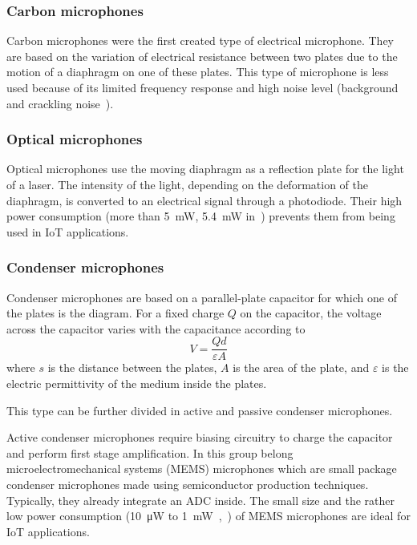 \documentclass{EPL-master-thesis-covers-EN}
\begin{document}
\subsubsection*{Carbon microphones}

Carbon microphones were the first created type of electrical microphone. They are based on the variation of electrical resistance between two plates due to the motion of a diaphragm on one of these plates. This type of microphone is less used because of its limited frequency response and high noise level (background and crackling noise~\cite{background.noise}).

\subsubsection*{Optical microphones}

Optical microphones use the moving diaphragm as a reflection plate for the light of a laser. The intensity of the light, depending on the deformation of the diaphragm, is converted to an electrical signal through a photodiode. Their high power consumption (more than \SI{5}{mW}, \SI{5.4}{mW} in~\cite{optical_microphone})  prevents them from being used in IoT applications.

\subsubsection*{Condenser microphones}

Condenser microphones are based on a parallel-plate capacitor for which one of the plates is the diagram. For a fixed charge $Q$ on the capacitor, the voltage across the capacitor varies with the capacitance according to
\[
V = \frac{Qd}{\varepsilon A}
\]
where $s$ is the distance between the plates, $A$ is the area of the plate, and $\varepsilon$ is the electric permittivity of the medium inside the plates.

This type can be further divided in active and passive condenser microphones.

Active condenser microphones require biasing circuitry to charge the capacitor and perform first stage amplification. In this group belong microelectromechanical systems (MEMS) microphones which are small package condenser microphones made using semiconductor production techniques. Typically, they already integrate an ADC inside. The small size and the rather low power consumption (\SI{10}{\micro W} to  \SI{1}{mW}~\cite{ICS40720},~\cite{10.3390/mi9070323}) of MEMS microphones are ideal for IoT applications.
 
\end{document}

